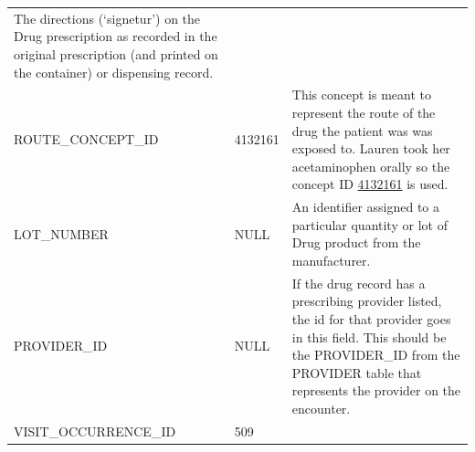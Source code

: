 \documentclass[]{book}
\begin{document}
\begin{longtable}[]{@{}lll@{}}
\begin{minipage}[t]{0.47\columnwidth}
The directions (`signetur') on the Drug prescription as recorded in the
original prescription (and printed on the container) or dispensing
record.\strut
\end{minipage}\tabularnewline
\begin{minipage}[t]{0.30\columnwidth}\raggedright\strut
ROUTE\_CONCEPT\_ID\strut
\end{minipage} & \begin{minipage}[t]{0.14\columnwidth}\raggedright\strut
4132161\strut
\end{minipage} & \begin{minipage}[t]{0.47\columnwidth}\raggedright\strut
This concept is meant to represent the route of the drug the patient was
was exposed to. Lauren took her acetaminophen orally so the concept ID
\href{http://athena.ohdsi.org/search-terms/terms/4132161}{4132161} is
used.\strut
\end{minipage}\tabularnewline
\begin{minipage}[t]{0.30\columnwidth}\raggedright\strut
LOT\_NUMBER\strut
\end{minipage} & \begin{minipage}[t]{0.14\columnwidth}\raggedright\strut
NULL\strut
\end{minipage} & \begin{minipage}[t]{0.47\columnwidth}\raggedright\strut
An identifier assigned to a particular quantity or lot of Drug product
from the manufacturer.\strut
\end{minipage}\tabularnewline
\begin{minipage}[t]{0.30\columnwidth}\raggedright\strut
PROVIDER\_ID\strut
\end{minipage} & \begin{minipage}[t]{0.14\columnwidth}\raggedright\strut
NULL\strut
\end{minipage} & \begin{minipage}[t]{0.47\columnwidth}\raggedright\strut
If the drug record has a prescribing provider listed, the id for that
provider goes in this field. This should be the PROVIDER\_ID from the
PROVIDER table that represents the provider on the encounter.\strut
\end{minipage}\tabularnewline
\begin{minipage}[t]{0.30\columnwidth}\raggedright\strut
VISIT\_OCCURRENCE\_ID\strut
\end{minipage} & \begin{minipage}[t]{0.14\columnwidth}\raggedright\strut
509\strut
\end{minipage} & \begin{minipage}[t]{0.47\columnwidth}\raggedright\strut

\end{minipage}
\end{longtable}
\end{document}
